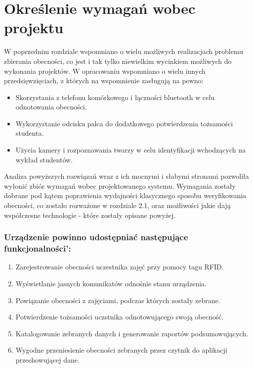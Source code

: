 \documentclass[declaration,shortabstract, mgr]{iithesis}
\begin{document}
\section{Określenie wymagań wobec projektu}
\indent W poprzednim rozdziale wspomniano o wielu możliwych realizacjach problemu zbierania obecności, co jest i tak tylko niewielkim wycinkiem możliwych do wykonania projektów. W opracowaniu \cite{review} wspomniano o wielu innych przedsięwzięciach, z których na wspomnienie zasługują na pewno:

\begin{itemize}
\item Skorzystania z telefonu komórkowego i łączności bluetooth w celu odnotowania obecności.
\item Wykorzystanie odcisku palca do dodatkowego potwierdzenia tożsamości studenta.
\item Użycia kamery i rozpoznawania twarzy w celu identyfikacji wchodzących na wykład studentów.
\end{itemize}

\indent Analiza powyższych rozwiązań wraz z ich mocnymi i słabymi stronami pozwoliła wyłonić zbiór wymagań wobec projektowanego systemu. Wymagania zostały dobrane pod kątem poprawienia wydajności klasycznego sposobu weryfikowania obecności, co zostało rozważone w rozdziale 2.1, oraz możliwości jakie dają współczesne technologie - które zostały opisane powyżej.

\subsubsection{Urządzenie powinno udostępniać następujące funkcjonalności':}

\begin{enumerate}
\item Zarejestrowanie obecności uczestnika zajęć przy pomocy tagu RFID.
\item Wyświetlanie jasnych komunikatów odnośnie stanu urządzenia.
\item Powiązanie obecności z zajęciami, podczas których zostały zebrane.
\item Potwierdzenie tożsamości uczstnika odnotowującego swoją obecność.
\item Katalogowanie zebranych danych i generowanie raportów podsumowujących.
\item Wygodne przeniesienie obecności zebranych przez czytnik do aplikacji przechowującej dane.
\end{enumerate}
\end{document}
